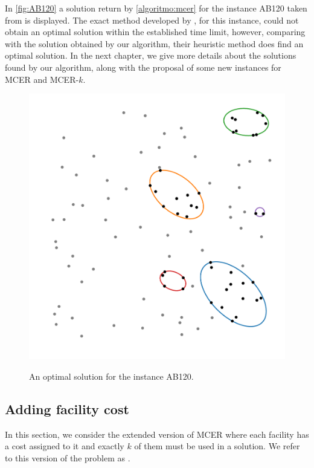 In \autoref{fig:AB120} a solution return by \autoref{algoritmo:mcer} for the instance AB120 taken from  is displayed. The exact method developed by , for this instance, could not obtain an optimal solution within the established time limit, however, comparing with the solution obtained by our algorithm, their heuristic method does find an optimal solution. In the next chapter, we give more details about the solutions found by our algorithm, along with the proposal of some new instances for MCER and MCER-$k$.


\begin{figure}[H]
	\centering
	\caption{An optimal solution for the instance AB120.}
	\includegraphics[scale=.5]{tex/figures/AB120}
	\fautor
	\label{fig:AB120}
\end{figure}

\subsection{Adding facility cost}

In this section, we consider the extended version of MCER where each facility has a cost assigned to it and exactly $k$ of them must be used in a solution. We refer to this version of the problem as . 

